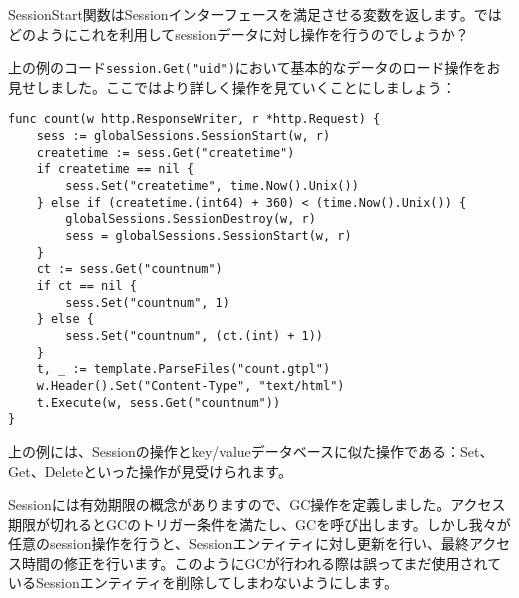 SessionStart関数はSessionインターフェースを満足させる変数を返します。ではどのようにこれを利用してsessionデータに対し操作を行うのでしょうか？

上の例のコード\texttt{session.Get("uid")}において基本的なデータのロード操作をお見せしました。ここではより詳しく操作を見ていくことにしましょう：

\begin{lstlisting}[numbers=none]
func count(w http.ResponseWriter, r *http.Request) {
    sess := globalSessions.SessionStart(w, r)
    createtime := sess.Get("createtime")
    if createtime == nil {
        sess.Set("createtime", time.Now().Unix())
    } else if (createtime.(int64) + 360) < (time.Now().Unix()) {
        globalSessions.SessionDestroy(w, r)
        sess = globalSessions.SessionStart(w, r)
    }
    ct := sess.Get("countnum")
    if ct == nil {
        sess.Set("countnum", 1)
    } else {
        sess.Set("countnum", (ct.(int) + 1))
    }
    t, _ := template.ParseFiles("count.gtpl")
    w.Header().Set("Content-Type", "text/html")
    t.Execute(w, sess.Get("countnum"))
}
\end{lstlisting}

上の例には、Sessionの操作とkey/valueデータベースに似た操作である：Set、Get、Deleteといった操作が見受けられます。

Sessionには有効期限の概念がありますので、GC操作を定義しました。アクセス期限が切れるとGCのトリガー条件を満たし、GCを呼び出します。しかし我々が任意のsession操作を行うと、Sessionエンティティに対し更新を行い、最終アクセス時間の修正を行います。このようにGCが行われる際は誤ってまだ使用されているSessionエンティティを削除してしまわないようにします。
